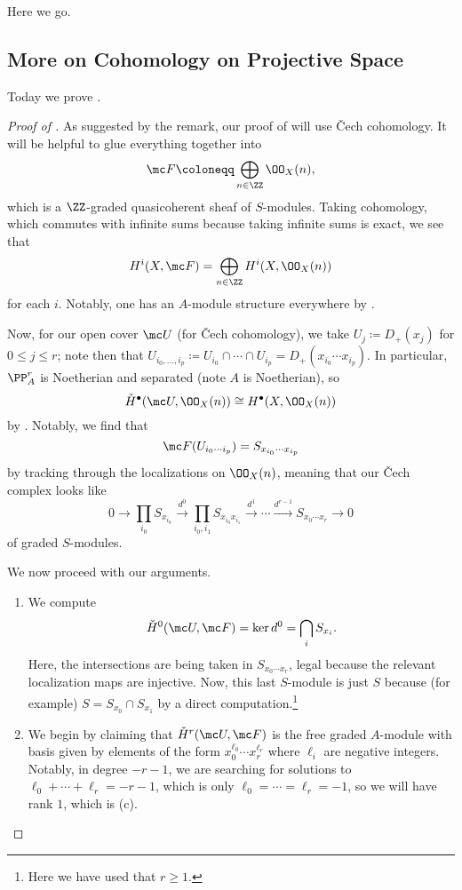 \documentclass[../notes.tex]{subfiles}
\begin{document}
Here we go.

\subsection{More on Cohomology on Projective Space}
Today we prove .
\begin{proof}[Proof of ]
	As suggested by the remark, our proof of  will use \v Cech cohomology. It will be helpful to glue everything together into
	\[\mc F\coloneqq\bigoplus_{n\in\ZZ}\OO_X(n),\]
	which is a $\ZZ$-graded quasicoherent sheaf of $S$-modules. Taking cohomology, which commutes with infinite sums because taking infinite sums is exact, we see that
	\[H^i(X,\mc F)=\bigoplus_{n\in\ZZ}H^i(X,\OO_X(n))\]
	for each $i$. Notably, one has an $A$-module structure everywhere by .

	Now, for our open cover $\mc U$ (for \v Cech cohomology), we take $U_j\coloneqq D_+(x_j)$ for $0\le j\le r$; note then that $U_{i_0,\ldots,i_p}\coloneqq U_{i_0}\cap\cdots\cap U_{i_p}=D_+(x_{i_0}\cdots x_{i_p})$. In particular, $\PP^r_A$ is Noetherian and separated (note $A$ is Noetherian), so
	\[\check H^\bullet(\mc U,\OO_X(n))\cong H^\bullet(X,\OO_X(n))\]
	by . Notably, we find that
	\[\mc F(U_{i_0\cdots i_p})=S_{x_{i_0}\cdots x_{i_p}}\]
	by tracking through the localizations on $\OO_X(n)$, meaning that our \v Cech complex looks like
	\[0\to\prod_{i_0}S_{x_{i_0}}\stackrel{d^0}\to\prod_{i_0,i_1}S_{x_{i_0}x_{i_1}}\stackrel{d^1}\to\cdots\stackrel{d^{r-1}}\to S_{x_0\cdots x_r}\to0\]
	of graded $S$-modules.

	We now proceed with our arguments.
	\begin{enumerate}[label=(\alph*)]
		\item We compute
		\[\check H^0(\mc U,\mc F)=\ker d^0=\bigcap_iS_{x_i}.\]
		Here, the intersections are being taken in $S_{x_0\cdots x_r}$, legal because the relevant localization maps are injective. Now, this last $S$-module is just $S$ because (for example) $S=S_{x_0}\cap S_{x_1}$ by a direct computation.\footnote{Here we have used that $r\ge1$.}

		\setcounter{enumi}{2}
		\item We begin by claiming that $\check H^r(\mc U,\mc F)$ is the free graded $A$-module with basis given by elements of the form $x_0^{\ell_0}\cdots x_r^{\ell_r}$ where $\ell_i$ are negative integers. Notably, in degree $-r-1$, we are searching for solutions to $\ell_0+\cdots+\ell_r=-r-1$, which is only $\ell_0=\cdots=\ell_r=-1$, so we will have rank $1$, which is (c).


\end{enumerate}
\end{proof}
\end{document}
